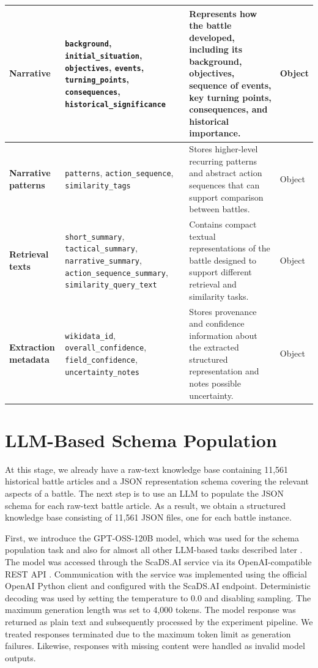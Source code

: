 \begin{table}[!htbp]
\begin{tabularx}{\textwidth}{
    >{\RaggedRight\arraybackslash}p{}
    >{\RaggedRight\arraybackslash}X
    >{\RaggedRight\arraybackslash}p{}
    >{\RaggedRight\arraybackslash}p{}
}
\textbf{Narrative} &
\texttt{background},
\texttt{initial\_situation},
\texttt{objectives},
\texttt{events},
\texttt{turning\_points},
\texttt{consequences},
\texttt{historical\_significance} &
Represents how the battle developed, including its
background, objectives, sequence of events, key turning
points, consequences, and historical importance. &
Object \\
\midrule

\textbf{Narrative patterns} &
\texttt{patterns},
\texttt{action\_sequence},
\texttt{similarity\_tags} &
Stores higher-level recurring patterns and abstract action
sequences that can support comparison between battles. &
Object \\
\midrule

\textbf{Retrieval texts} &
\texttt{short\_summary},
\texttt{tactical\_summary},
\texttt{narrative\_summary},
\texttt{action\_sequence\_summary},
\texttt{similarity\_query\_text} &
Contains compact textual representations of the battle
designed to support different retrieval and similarity tasks. &
Object \\
\midrule

\textbf{Extraction metadata} &
\texttt{wikidata\_id},
\texttt{overall\_confidence},
\texttt{field\_confidence},
\texttt{uncertainty\_notes} &
Stores provenance and confidence information about the
extracted structured representation and notes possible
uncertainty. &
Object \\

\bottomrule
\end{tabularx}
\end{table}
\section{LLM-Based Schema Population}
At this stage, we already have a raw-text knowledge base containing 11,561 historical battle articles and a JSON representation schema covering the relevant aspects of a battle. The next step is to use an LLM to populate the JSON schema for each raw-text battle article. As a result, we obtain a structured knowledge base consisting of 11,561 JSON files, one for each battle instance.

First, we introduce the GPT-OSS-120B model, which was used for the schema population task and also for almost all other LLM-based tasks described later \citep{openai2025gptoss}. The model was accessed through the ScaDS.AI service via its OpenAI-compatible REST API \citep{scadsai2026}. Communication with the service was implemented using the official OpenAI Python client and configured with the ScaDS.AI endpoint. Deterministic decoding was used by setting the temperature to 0.0 and disabling sampling. The maximum generation length was set to 4,000 tokens. The model response was returned as plain text and subsequently processed by the experiment pipeline. We treated responses terminated due to the maximum token limit as generation failures. Likewise, responses with missing content were handled as invalid model outputs.

